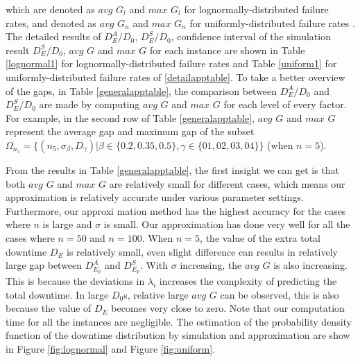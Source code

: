 \documentclass[preprint,12pt]{elsarticle}
\begin{document}
which are denoted as $avg$ $ G_l$ and $max $ $G_l$ for lognormally-distributed failure rates, and denoted as $avg$ $G_n$ and $max$ $G_n$ for uniformly-distributed failure rates . The detailed results of $D_{E}^{A}/D_0$, $D_{E}^{S}/D_0$, confidence interval of the simulation result $D_{E}^{S}/D_0$, $avg$ $G$ and $max$ $G$ for each instance are shown in Table \ref{lognormal1} for lognormally-distributed failure rates and Table \ref{uniform1} for uniformly-distributed failure rates of \ref{detailapptable}. To take a better overview of the gaps, in Table \ref{generalapptable}, the comparison between $D_{E}^{A}/D_0$ and $D_{E}^{S}/D_0$ are made by computing $avg$ $G$ and $max$ $G$ for each level of every factor. For example, in the second row of Table \ref{generalapptable}, $avg$ $G$ and $max$ $G$ represent the average gap and maximum gap of the subset $\Omega_{n_{5}}=\{(n_{5},\sigma_{\beta},D_{\gamma})|\beta\in\{0.2,0.35,0.5\},\gamma\in\{01,02,03,04\}\}$ (when $n=5$).

From the results in Table \ref{generalapptable}, the first insight we can get is that both $avg$ $G$ and $max$ $G$ are relatively small for different cases, which means our approximation is relatively accurate under various parameter settings. Furthermore, our approxi mation method has the highest accuracy for the cases where $n$ is large and $\sigma$ is small. Our approximation has done very well for all the cases where $n=50$ and $n=100$. When $n=5$, the value of the extra total downtime $D_{E}$ is relatively small, even slight difference can results in relatively large gap between $D_{E_{p}}^{A}$ and $D_{E_{p}}^{S}$. With $\sigma$ increasing, the $avg$ $G$ is also increasing. This is because the deviations in $\lambda_{i}$ increases the complexity of predicting the total downtime. In large $D_{0}$s, relative large $avg$ $G$ can be observed, this is also because the value of $D_{E}$ becomes very close to zero. Note that our computation time for all the instances are negligible. The estimation of the probability density function of the downtime distribution by simulation and approximation are show in Figure \ref{fig:lognormal} and Figure \ref{fig:uniform}.

\end{document}
